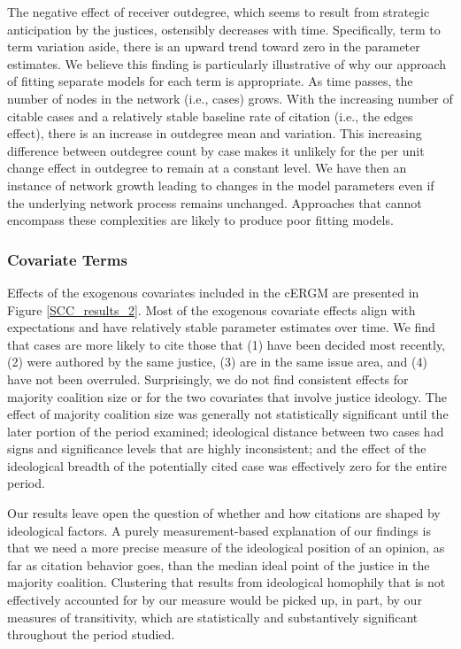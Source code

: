 \documentclass[headsepline=true, abstracton]{scrartcl}
\begin{document}
The negative effect of receiver outdegree, which seems to result from strategic anticipation by the justices, ostensibly decreases with time. Specifically, term to term variation aside, there is an upward trend toward zero in the parameter estimates. We believe this finding is particularly illustrative of why our approach of fitting separate models for each term is appropriate. As time passes, the number of nodes in the network (i.e., cases) grows. With the increasing number of citable cases and a relatively stable baseline rate of citation (i.e., the edges effect), there is an increase in outdegree mean and variation. This increasing difference between outdegree count by case makes it unlikely for the per unit change effect in outdegree to remain at a constant level. We have then an instance of network growth leading to changes in the model parameters even if the underlying network process remains unchanged. Approaches that cannot encompass these complexities are likely to produce poor fitting models.

\subsubsection{Covariate Terms}
Effects of the exogenous covariates included in the cERGM are presented in Figure \ref{SCC_results_2}. Most of the exogenous covariate effects align with expectations and have relatively stable parameter estimates over time. We find that cases are more likely to cite those that (1) have been decided most recently, (2) were authored by the same justice, (3) are in the same issue area, and (4) have not been overruled. Surprisingly, we do not find consistent effects for majority coalition size or for the two covariates that involve justice ideology. The effect of majority coalition size was generally not statistically significant until the later portion of the period examined; ideological distance between two cases had signs and significance levels that are highly inconsistent; and the effect of the ideological breadth of the potentially cited case was effectively zero for the entire period. 

Our results leave open the question of whether and how citations are shaped by ideological factors. A purely measurement-based explanation of our findings is that we need a more precise measure of the ideological position of an opinion, as far as citation behavior goes, than the median ideal point of the justice in the majority coalition. Clustering that results from ideological homophily that is not effectively accounted for by our measure would be picked up, in part, by our measures of transitivity, which are statistically and substantively significant throughout the period studied. 
\end{document}
